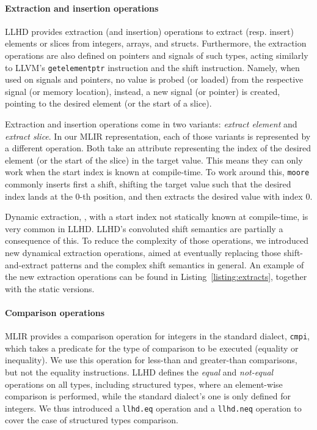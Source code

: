 \paragraph{Extraction and insertion operations}
LLHD provides extraction (and insertion) operations to extract (resp. insert) elements or slices from integers, arrays, and structs. Furthermore, the extraction operations are also defined on pointers and signals of such types, acting similarly to LLVM's \texttt{getelementptr} instruction and the shift instruction. Namely, when used on signals and pointers, no value is probed (or loaded) from the respective signal (or memory location), instead, a new signal (or pointer) is created, pointing to the desired element (or the start of a slice).

Extraction and insertion operations come in two variants: \textit{extract element} and \textit{extract slice}. In our MLIR representation, each of those variants is represented by a different operation. Both take an attribute representing the index of the desired element (or the start of the slice) in the target value. This means they can only work when the start index is known at compile-time. To work around this, \texttt{moore} commonly inserts first a shift, shifting the target value such that the desired index lands at the $0$-th position, and then extracts the desired value with index $0$.

Dynamic extraction, \ie, with a start index not statically known at compile-time, is very common in LLHD. LLHD's convoluted shift semantics are partially a consequence of this. To reduce the complexity of those operations, we introduced new dynamical extraction operations, aimed at eventually replacing those shift-and-extract patterns and the complex shift semantics in general. An example of the new extraction operations can be found in Listing~\ref{listing:extracts}, together with the static versions.


\paragraph{Comparison operations}
MLIR provides a comparison operation for integers in the standard dialect, \texttt{cmpi}, which takes a predicate for the type of comparison to be executed (\eg equality or inequality). We use this operation for less-than and greater-than comparisons, but not the equality instructions. LLHD defines the \textit{equal} and \textit{not-equal} operations on all types, including structured types, where an element-wise comparison is performed, while the standard dialect's one is only defined for integers. We thus introduced a \texttt{llhd.eq} operation and a \texttt{llhd.neq} operation to cover the case of structured types comparison.
